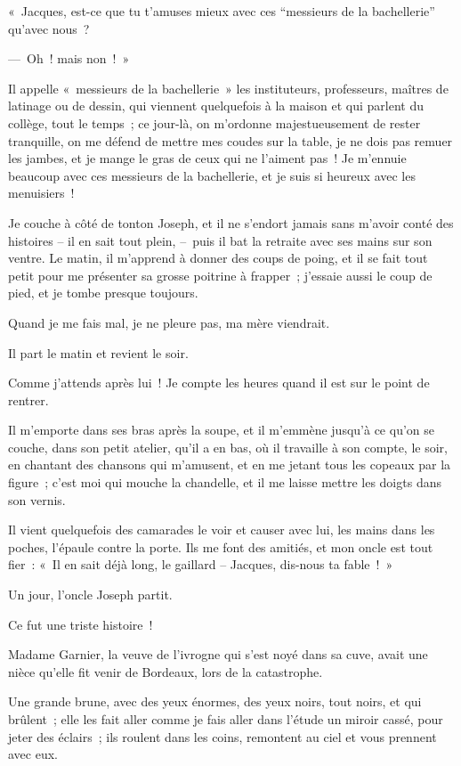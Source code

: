 \documentclass[french,twoside]{book} %
\begin{document}
« Jacques, est-ce que tu t’amuses mieux avec ces “messieurs de la bachellerie” qu’avec nous ?\par
— Oh ! mais non ! »\par
Il appelle « messieurs de la bachellerie » les instituteurs, professeurs, maîtres de latinage ou de dessin, qui viennent quelquefois à la maison et qui parlent du collège, tout le temps ; ce jour-là, on m’ordonne majestueusement de rester tranquille, on me défend de mettre mes coudes sur la table, je ne dois pas remuer les jambes, et je mange le gras de ceux qui ne l’aiment pas ! Je m’ennuie beaucoup avec ces messieurs de la bachellerie, et je suis si heureux avec les menuisiers !\par
Je couche à côté de tonton Joseph, et il ne s’endort jamais sans m’avoir conté des histoires – il en sait tout plein, – puis il bat la retraite avec ses mains sur son ventre. Le matin, il m’apprend à donner des coups de poing, et il se fait tout petit pour me présenter sa grosse poitrine à frapper ; j’essaie aussi le coup de pied, et je tombe presque toujours.\par
Quand je me fais mal, je ne pleure pas, ma mère viendrait.\par
Il part le matin et revient le soir.\par
Comme j’attends après lui ! Je compte les heures quand il est sur le point de rentrer.\par
Il m’emporte dans ses bras après la soupe, et il m’emmène jusqu’à ce qu’on se couche, dans son petit atelier, qu’il a en bas, où il travaille à son compte, le soir, en chantant des chansons qui m’amusent, et en me jetant tous les copeaux par la figure ; c’est moi qui mouche la chandelle, et il me laisse mettre les doigts dans son vernis.\par
Il vient quelquefois des camarades le voir et causer avec lui, les mains dans les poches, l’épaule contre la porte. Ils me font des amitiés, et mon oncle est tout fier : « Il en sait déjà long, le gaillard – Jacques, dis-nous ta fable ! »\par
Un jour, l’oncle Joseph partit.\par
Ce fut une triste histoire !\par
Madame Garnier, la veuve de l’ivrogne qui s’est noyé dans sa cuve, avait une nièce qu’elle fit venir de Bordeaux, lors de la catastrophe.\par
Une grande brune, avec des yeux énormes, des yeux noirs, tout noirs, et qui brûlent ; elle les fait aller comme je fais aller dans l’étude un miroir cassé, pour jeter des éclairs ; ils roulent dans les coins, remontent au ciel et vous prennent avec eux.\par
\end{document}
